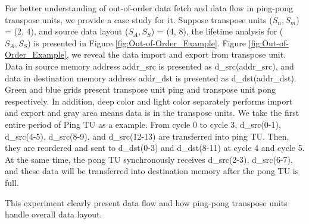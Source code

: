 \documentclass[10pt,journal,compsoc]{IEEEtran}
\begin{document}
For better understanding of out-of-order data fetch and data flow in ping-pong transpose units,
 we provide a case study for it. Suppose transpose units ($S_{n}, S_{m}$) = (2, 4), and source data layout ($S_{A}, S_{S}$) = (4, 8), the lifetime analysis for ($S_{A}, S_{S}$) is presented in Figure \ref{fig:Out-of-Order_Example}. Figure \ref{fig:Out-of-Order_Example}, we reveal the data import and export from transpose unit.
 Data in source memory address addr\_src is presented as d\_src(addr\_src), and data in destination memory address addr\_dst is presented as d\_dst(addr\_dst).
  Green and blue grids present transpose unit ping and transpose unit pong respectively. In addition, deep color and light color separately performs import and export and gray area means data is in the transpose units.
 We take the first entire period of Ping TU as a example.
 From cycle 0 to cycle 3, d\_src(0-1), d\_src(4-5), d\_src(8-9), and d\_src(12-13) are transferred into ping TU.
Then, they are reordered and sent to d\_dst(0-3) and d\_dst(8-11) at cycle 4 and cycle 5.
At the same time, the pong TU synchronously receives d\_src(2-3), d\_src(6-7), and these data will be transferred into destination memory after the pong TU is full.

 This experiment clearly present data flow and how ping-pong transpose units handle overall data layout.
\end{document}
